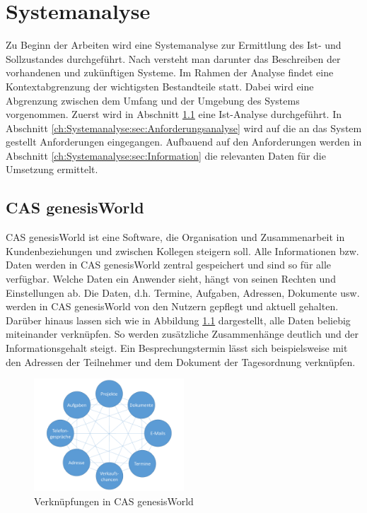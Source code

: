 
\chapter{Systemanalyse}
\label{ch:Systemanalyse}

Zu Beginn der Arbeiten wird eine Systemanalyse zur Ermittlung des Ist- und Sollzustandes durchgeführt. Nach \cite{SWB-380277719} versteht man darunter das Beschreiben der vorhandenen und zukünftigen Systeme. Im Rahmen der Analyse findet eine Kontextabgrenzung der wichtigsten Bestandteile statt. Dabei wird eine Abgrenzung zwischen dem Umfang und der Umgebung des Systems vorgenommen. Zuerst wird in Abschnitt \ref{ch:Systemanalyse:sec:genesisWorld} eine Ist-Analyse durchgeführt. In Abschnitt \ref{ch:Systemanalyse:sec:Anforderungsanalyse} wird auf die an das System gestellt Anforderungen eingegangen. Aufbauend auf den Anforderungen werden in Abschnitt \ref{ch:Systemanalyse:sec:Information} die relevanten Daten für die Umsetzung ermittelt. 

\section{CAS genesisWorld}
\label{ch:Systemanalyse:sec:genesisWorld}

CAS genesisWorld ist eine Software, die Organisation und Zusammenarbeit in Kundenbeziehungen und zwischen Kollegen steigern soll. Alle Informationen bzw. Daten werden in CAS genesisWorld zentral gespeichert und sind so für alle verfügbar. Welche Daten ein Anwender sieht, hängt von seinen Rechten und Einstellungen ab. Die Daten, d.h. Termine, Aufgaben, Adressen, Dokumente usw. werden in CAS genesisWorld von den Nutzern gepflegt und aktuell gehalten. Darüber hinaus lassen sich wie in Abbildung \ref{picGwCon} dargestellt, alle Daten beliebig miteinander verknüpfen. So werden zusätzliche Zusammenhänge deutlich und der Informationsgehalt steigt. Ein Besprechungstermin lässt sich beispielsweise mit den Adressen der Teilnehmer und dem Dokument der Tagesordnung verknüpfen.

\begin{figure}[H]
	\centering
  \includegraphics[width=0.5\textwidth, width=0.5\textwidth]{pics/CAS_connections.pdf}
	\caption{Verknüpfungen in CAS genesisWorld}
	\label{picGwCon}
\end{figure}

